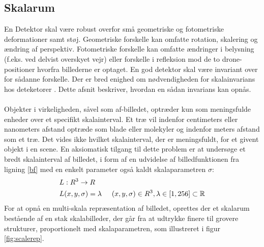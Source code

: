 \subsection{Skalarum}
\label{sec:scale}
En Detektor skal være robust overfor små geometriske og fotometriske deformationer samt støj. Geometriske forskelle kan omfatte rotation, skalering og ændring af perspektiv.  Fotometriske forskelle kan omfatte ændringer i belysning (f.eks. ved delvist overskyet vejr) eller forskelle i refleksion mod de to drone-positioner hvorfra billederne er optaget. En god detektor skal være invariant over for sådanne forskelle. Der er bred enighed om nødvendigheden for skalainvarians hos deteketorer \cite{koen} \cite{blob} \cite{lindenscale}. Dette afsnit beskriver, hvordan en sådan invarians kan opnås. \\ \\
Objekter i virkeligheden, såvel som  af-billedet, optræder kun som meningsfulde enheder over et specifikt skalainterval. Et træ vil indenfor centimeters eller nanometers afstand optræde som blade eller molekyler og indenfor meters afstand som et træ. 
Det vides ikke hvilket skalainterval, der er meningsfuldt, for et givent objekt i en scene. 
En aksiomatisk tilgang til dette problem er at undersøge et bredt skalainterval af billedet, i form af en udvidelse af billedfunktionen fra ligning \eqref{bf} med en enkelt parameter også kaldt skalaparametren $\sigma$:
\begin{equation}
\begin{split}
&L: R^3 \rightarrow R \\
&L(x,y,\sigma) = \lambda \hspace{0.5 cm} (x,y,\sigma)\in R^3, \lambda \in [1,256] \subset \mathbb{R}
\end{split}
\end{equation}
For at opnå en multi-skala repræsentation af billedet, oprettes der et skalarum bestående af en stak skalabilleder, der går fra at udtrykke finere til grovere strukturer, proportionelt med skalaparametren, som illustreret i figur \ref{fig:scalerep}. 
